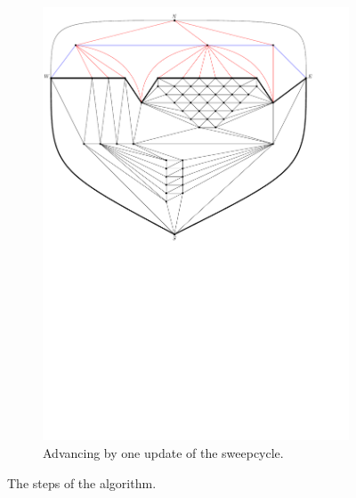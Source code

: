 \begin{figure}
\begin{subfigure}[b]{.9 \textwidth}
      \label{fig:ex:vert:sweep1}
    \end{subfigure}
    ~
    \begin{subfigure}[b]{.9 \textwidth}
      \includegraphics[width=\textwidth]{examples/img/vertWorstCase/sweep2}
      \caption{Advancing by one update of the sweepcycle.}
      \label{fig:ex:vert:sweep2}
    \end{subfigure}
    \label{fig:ex:vert}
    \caption{The steps of the algorithm.}
\end{figure}

